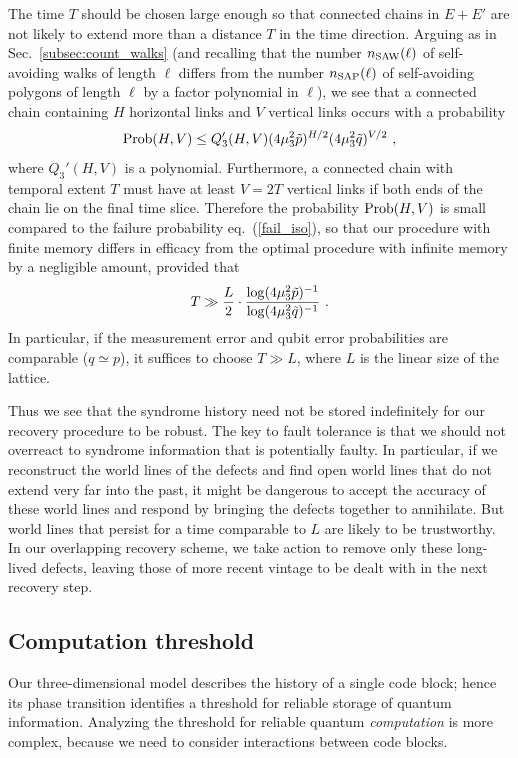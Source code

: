 The time $T$ should be chosen large enough so that connected chains in $E+E'$ are not likely to extend more than a distance $T$ in the time direction. Arguing as in Sec.~\ref{subsec:count_walks} (and recalling that the number $n_{\rm SAW}(\ell)$ of self-avoiding walks of length $\ell$ differs from the number $n_{\rm SAP}(\ell)$ of self-avoiding polygons of length $\ell$ by a factor polynomial in $\ell$), we see that a connected chain containing $H$ horizontal links and $V$ vertical links occurs with a probability
\begin{equation}
{\rm Prob}(H,V) \le Q_3'(H,V) (4\mu_3^2\tilde p)^{H/2}(4\mu_3^2\tilde q)^{V/2}~,
\end{equation}
where $Q_3'(H,V)$ is a polynomial.
Furthermore, a connected chain with temporal extent $T$ must have at least $V=2T$ vertical links if both ends of the chain lie on the final time slice. Therefore the probability ${\rm Prob}(H,V)$ is small compared to the failure probability eq.~(\ref{fail_iso}), so that our procedure with finite memory differs in efficacy from the optimal procedure with infinite memory by a negligible amount, provided that
\begin{equation}
T \gg {L\over 2} \cdot {\log(4\mu_3^2\tilde p)^{-1}\over \log(4\mu_3^2\tilde q)^{-1}}~.
\end{equation}
In particular, if the measurement error and qubit error probabilities are comparable ($q\simeq p$), it suffices to choose $T\gg L$, where $L$ is the linear size of the lattice.

Thus we see that the syndrome history need not be stored indefinitely for our recovery procedure to be robust. The key to fault tolerance is that we should not overreact to syndrome information that is potentially faulty. In particular, if we reconstruct the world lines of the defects and find open world lines that do not extend very far into the past, it might be dangerous to accept the accuracy of these world lines and respond by bringing the defects together to annihilate. But world lines that persist for a time comparable to $L$ are likely to be trustworthy. In our overlapping recovery scheme, we take action to remove only these long-lived defects, leaving those of more recent vintage to be dealt with in the next recovery step. 

\subsection{Computation threshold}
\label{subsec:comp_thresh}
Our three-dimensional model describes the history of a single code block; hence its phase transition identifies a threshold for reliable {\rm storage} of quantum information. Analyzing the threshold for reliable quantum {\em computation} is more complex, because we need to consider interactions between code blocks.

